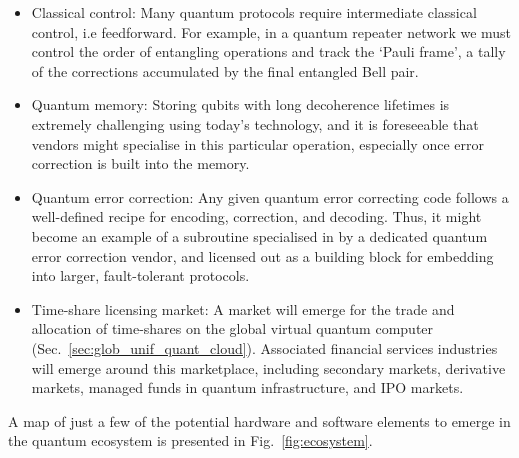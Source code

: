 \begin{itemize}
\item Classical control: Many quantum protocols require intermediate classical control, i.e feedforward. For example, in a quantum repeater network we must control the order of entangling operations and track the `Pauli frame', a tally of the corrections accumulated by the final entangled Bell pair.

\item Quantum memory: Storing qubits with long decoherence lifetimes is extremely challenging using today's technology, and it is foreseeable that vendors might specialise in this particular operation, especially once error correction is built into the memory. 

\item Quantum error correction: Any given quantum error correcting code follows a well-defined recipe for encoding, correction, and decoding. Thus, it might become an example of a subroutine specialised in by a dedicated quantum error correction vendor, and licensed out as a building block for embedding into larger, fault-tolerant protocols.

\item Time-share licensing market: A market will emerge for the trade and allocation of time-shares on the global virtual quantum computer (Sec.~\ref{sec:glob_unif_quant_cloud}). Associated financial services industries will emerge around this marketplace, including secondary markets, derivative markets, managed funds in quantum infrastructure, and IPO markets.
\end{itemize}

A map of just a few of the potential hardware and software elements to emerge in the quantum ecosystem is presented in Fig.~\ref{fig:ecosystem}.